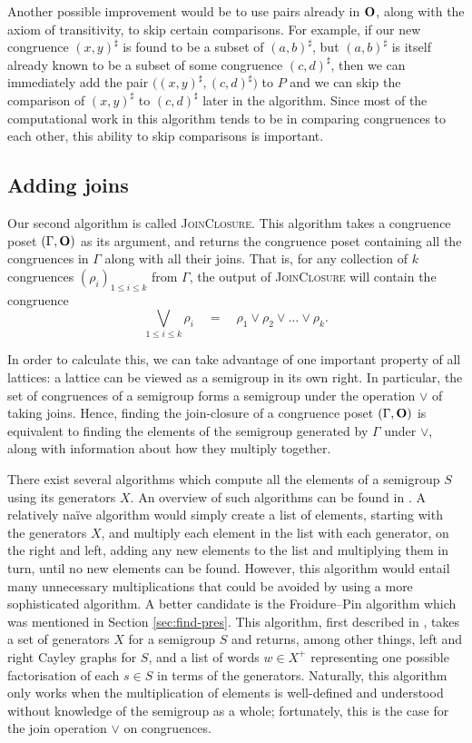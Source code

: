 Another possible improvement would be to use pairs already in $\mathbf{O}$, along with
the axiom of transitivity, to skip certain comparisons.  For example, if our new
congruence $(x,y)^\sharp$ is found to be a subset of $(a,b)^\sharp$, but
$(a,b)^\sharp$ is itself already known to be a subset of some congruence
$(c,d)^\sharp$, then we can immediately add the pair
$\big((x,y)^\sharp, (c,d)^\sharp\big)$ to $P$ and we can skip the comparison of
$(x,y)^\sharp$ to $(c,d)^\sharp$ later in the algorithm.  Since most of the
computational work in this algorithm tends to be in comparing congruences to
each other, this ability to skip comparisons is important.

\subsection{Adding joins}
\label{sec:join-closure}

Our second algorithm is called \textsc{JoinClosure}.  This algorithm takes a
congruence poset $(\Gamma, \mathbf{O})$ as its argument, and returns the congruence
poset containing all the congruences in $\Gamma$ along with all their joins.
That is, for any collection of $k$ congruences
$(\rho_i)_{1 \leq i \leq k}$ from $\Gamma$, the output of
\textsc{JoinClosure} will contain the congruence
$$\bigvee_{1 \leq i \leq k} \rho_i
\quad=\quad \rho_1 \vee \rho_2 \vee \ldots \vee \rho_k.$$

In order to calculate this, we can take advantage of one important property of
all lattices: a lattice can be viewed as a semigroup in its own right.  In
particular, the set of congruences of a semigroup forms a semigroup under the
operation $\vee$ of taking joins.  Hence, finding the join-closure of a
congruence poset $(\Gamma, \mathbf{O})$ is equivalent to finding the elements of the
semigroup generated by $\Gamma$ under $\vee$, along with information about how
they multiply together.

There exist several algorithms which compute all the elements of a semigroup $S$
using its generators $X$.  An overview of such algorithms can be found in
\cite[\S1]{computing_finite_semigroups}.  A relatively na\"ive algorithm would
simply create a list of elements, starting with the generators $X$, and multiply
each element in the list with each generator, on the right and left, adding any
new elements to the list and multiplying them in turn, until no new elements can
be found.  However, this algorithm would entail many unnecessary multiplications
that could be avoided by using a more sophisticated algorithm.  A better
candidate is the Froidure--Pin algorithm which was mentioned in Section
\ref{sec:find-pres}.  This algorithm, first described in \cite{froidure_pin},
takes a set of generators $X$ for a semigroup $S$ and returns, among other
things, left and right Cayley graphs for $S$, and a list of words $w \in X^+$
representing one possible factorisation of each $s \in S$ in terms of the
generators.  Naturally, this algorithm only works when the multiplication of
elements is well-defined and understood without knowledge of the semigroup as a
whole; fortunately, this is the case for the join operation $\vee$ on
congruences.

